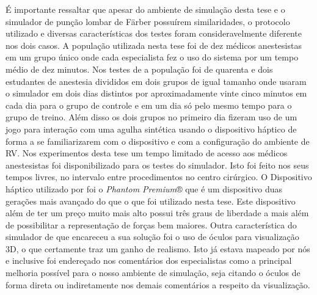 É importante ressaltar que apesar do ambiente de simulação desta tese e o simulador de punção lombar de Färber \cite{Farber2009} possuírem similaridades, o protocolo utilizado e diversas características dos testes foram consideravelmente diferente nos dois casos. A população utilizada nesta tese foi de dez médicos anestesistas em um grupo único onde cada especialista fez o uso do sistema por um tempo médio de dez minutos. Nos testes de \textcite{Farber2009} a população foi de quarenta e dois estudantes de anestesia divididos em dois grupos de igual tamanho onde usaram o simulador em dois dias distintos por aproximadamente vinte cinco minutos em cada dia para o grupo de controle e em um dia só pelo mesmo tempo para o grupo de treino. Além disso os dois grupos no primeiro dia fizeram uso de um jogo para interação com uma agulha sintética usando o dispositivo háptico de forma a se familiarizarem com o dispositivo e com a configuração do ambiente de \acrshort{RV}. Nos experimentos desta tese um tempo limitado de acesso aos médicos anestesistas foi disponibilizado para os testes do simulador. Isto foi feito nos seus tempos livres, no intervalo entre procedimentos no centro cirúrgico.
O Dispositivo háptico utilizado por \textcite{Farber2009} foi o \textit{Phantom Premium}® que é um dispositivo duas gerações mais avançado do que o que foi utilizado nesta tese. Este dispositivo além de ter um preço muito mais alto possui três graus de liberdade a mais além de possibilitar a representação de forças bem maiores. Outra característica do simulador de \textcite{Farber2009} que encareceu a sua solução foi o uso de óculos para visualização 3D, o que certamente traz um ganho de realismo. Isto já estava mapeado por nós e inclusive foi endereçado nos comentários dos especialistas como a principal melhoria possível para o nosso ambiente de simulação, seja citando o óculos de forma direta ou indiretamente nos demais comentários a respeito da visualização. 

